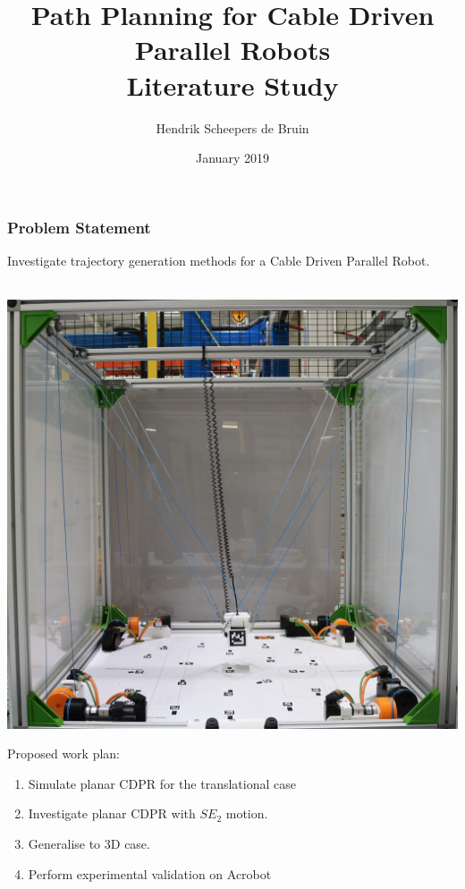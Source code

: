\documentclass{beamer}
\title{Path Planning for Cable Driven Parallel Robots\\Literature Study}
\author{Hendrik Scheepers de Bruin}
\institute{École Centrale de Nantes, Università degli Studi di Genova}
\date{January 2019}
\begin{document}

	\frame{\titlepage}

	\begin{frame}
		\frametitle{Problem Statement}

		Investigate trajectory generation methods for a Cable Driven Parallel
		Robot.
		\\~\

		\begin{minipage}{\textwidth}
			\begin{minipage}{0.5\textwidth}
				\centering
				\includegraphics[width=.9\textwidth]{acrobotHD}
			\end{minipage}
			\begin{minipage}{0.5\textwidth}

				Proposed work plan:

				\begin{enumerate}

					\item

						Simulate planar CDPR for the translational case

					\item

						Investigate planar CDPR with $SE_2$ motion.

					\item

						Generalise to 3D case.

					\item

						Perform experimental validation on Acrobot

				\end{enumerate}
			\end{minipage}
		\end{minipage}

	\end{frame}
\end{document}
